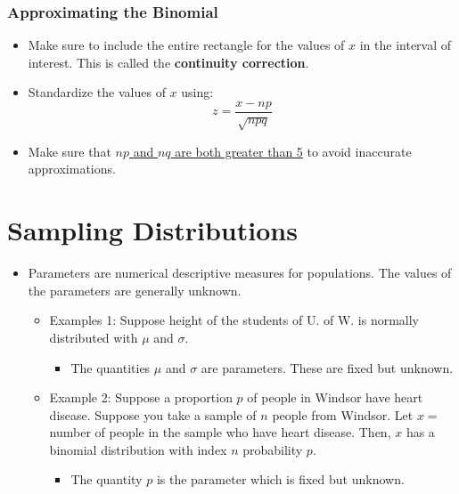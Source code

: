 \documentclass[12pt, letterpaper]{article}
\begin{document}
            \subsubsection{Approximating the Binomial}
                \begin{itemize}
                    \item Make sure to include the entire rectangle for the values of $x$ in the interval of interest. This is called the \textbf{continuity correction}.
                    \item Standardize the values of $x$ using:
                    \begin{equation}
                        z = \frac{x - np}{\sqrt{npq}}
                    \end{equation}
                    \item Make sure that \underline{$np$ and $nq$ are both greater than 5} to avoid inaccurate approximations.
                \end{itemize}

    \section{Sampling Distributions} 
        \begin{itemize}
            \item Parameters are numerical descriptive measures for populations. The values of the parameters are generally unknown.
            \begin{itemize}
                \item Examples 1: Suppose height of the students of U. of W. is normally distributed with $\mu$ and $\sigma$.
                \begin{itemize}
                    \item The quantities $\mu$ and $\sigma$ are parameters. These are fixed but unknown.
                \end{itemize}
                \item Example 2: Suppose a proportion $p$ of people in Windsor have heart disease. Suppose you take a sample of $n$ people from Windsor. Let $x = $ number of people in the sample who have heart disease. Then, $x$ has a binomial distribution with index $n$ probability $p$.
                \begin{itemize}
                    \item The quantity $p$ is the parameter which is fixed but unknown.
                \end{itemize}
            \end{itemize}
        \end{itemize}
\end{document}
